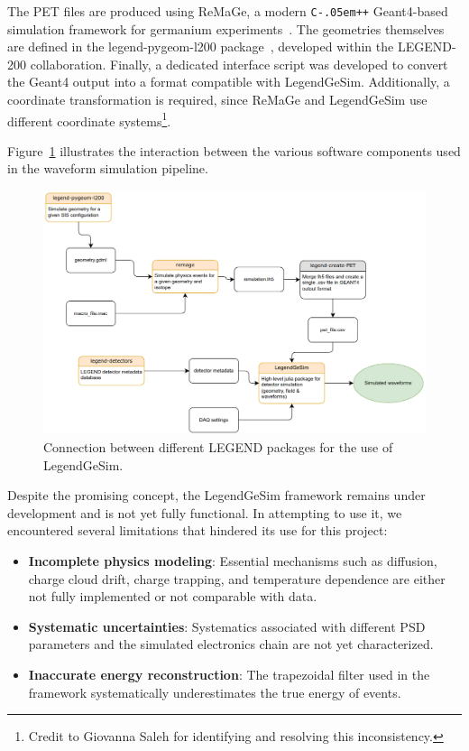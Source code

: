 The PET files are produced using ReMaGe, a modern \texttt{C\kern-.05em\texttt{++}} Geant4-based simulation framework for germanium experiments~\cite{pertoldi_remage_2025}. The geometries themselves are defined in the legend-pygeom-l200 package~\cite{noauthor_legend-explegend-pygeom-l200_2025}, developed within the LEGEND-200 collaboration. 
Finally, a dedicated interface script was developed to convert the Geant4 output into a format compatible with LegendGeSim. Additionally, a coordinate transformation is required, since ReMaGe and LegendGeSim use different coordinate systems\footnote{Credit to Giovanna Saleh for identifying and resolving this inconsistency.}.  

Figure~\ref{fig:PSS_diagram} illustrates the interaction between the various software components used in the waveform simulation pipeline. 

\begin{figure}
\centering
\includegraphics[width=\linewidth]{figures/05_PSD/PSS_diagram.png}
\caption{Connection between different LEGEND packages for the use of LegendGeSim.} 
\label{fig:PSS_diagram}
\end{figure}

Despite the promising concept, the LegendGeSim framework remains under development and is not yet fully functional. In attempting to use it, we encountered several limitations that hindered its use for this project: 
\begin{itemize}
\item \textbf{Incomplete physics modeling}: Essential mechanisms such as diffusion, charge cloud drift, charge trapping, and temperature dependence are either not fully implemented or not comparable with data.  
\item \textbf{Systematic uncertainties}: Systematics associated with different PSD parameters and the simulated electronics chain are not yet characterized. 
\item \textbf{Inaccurate energy reconstruction}: The trapezoidal filter used in the framework systematically underestimates the true energy of events. 
\end{itemize}

